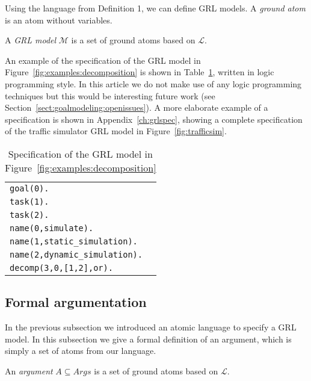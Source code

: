 Using the language from Definition 1, we can define GRL models. A \emph{ground atom} is an atom without variables.

\begin{definition} \label{def:argument}
A \emph{GRL model} $\mathcal{M}$ is a set of ground atoms based on $\mathcal{L}$.
\end{definition}

An example of the specification of the GRL model in Figure~\ref{fig:examples:decomposition} is shown in Table~\ref{table:grl_atom_spec}, written in logic programming style. In this article we do not make use of any logic programming techniques but this would be interesting future work (see Section~\ref{sect:goalmodeling:openissues}). A more elaborate example of a specification is shown in Appendix~\ref{ch:grlspec}, showing a complete specification of the traffic simulator GRL model in Figure~\ref{fig:trafficsim}.

\begin{table}[h!]
\centering
\begin{tabularx}{0.4\textwidth}{|X|}
\hline
\texttt{goal(0).}\\
\texttt{task(1).}\\
\texttt{task(2).}\\
\texttt{name(0,simulate).}\\
\texttt{name(1,static\_simulation).}\\
\texttt{name(2,dynamic\_simulation).}\\
\texttt{decomp(3,0,[1,2],or).}\\
\hline
\end{tabularx}
\caption{Specification of the GRL model in Figure~\ref{fig:examples:decomposition}}
\label{table:grl_atom_spec}
\end{table}

\subsection{Formal argumentation}
\label{sect:goalmodeling:argumentationsemantics}

In the previous subsection we introduced an atomic language to specify a GRL model. In this subsection we give a formal definition of an argument, which is simply a set of atoms from our language.

\begin{definition}[Argument] \label{def:argument}
An \emph{argument} $A\subseteq Args$ is a set of ground atoms based on $\mathcal{L}$.
\end{definition}

